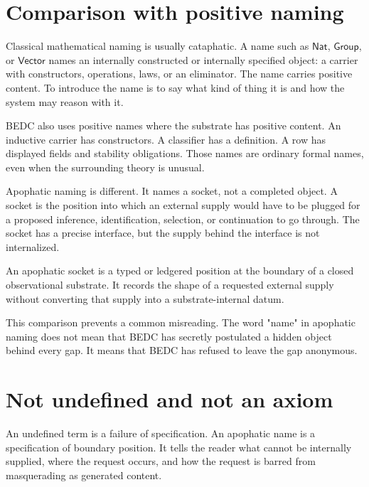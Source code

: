 \section{Comparison with positive naming}
\label{sec:apophatic-naming-positive-comparison}

Classical mathematical naming is usually cataphatic. A name such as $\mathsf{Nat}$, $\mathsf{Group}$, or $\mathsf{Vector}$ names an internally constructed or internally specified object: a carrier with constructors, operations, laws, or an eliminator. The name carries positive content. To introduce the name is to say what kind of thing it is and how the system may reason with it.

BEDC also uses positive names where the substrate has positive content. An inductive carrier has constructors. A classifier has a definition. A \NameCert{} row has displayed fields and stability obligations. Those names are ordinary formal names, even when the surrounding theory is unusual.

Apophatic naming is different. It names a socket, not a completed object. A socket is the position into which an external supply would have to be plugged for a proposed inference, identification, selection, or continuation to go through. The socket has a precise interface, but the supply behind the interface is not internalized.

\begin{definition}
\label{def:apophatic-socket-rather-than-object}
An apophatic socket is a typed or ledgered position at the boundary of a closed observational substrate. It records the shape of a requested external supply without converting that supply into a substrate-internal datum.
\end{definition}

This comparison prevents a common misreading. The word "name" in apophatic naming does not mean that BEDC has secretly postulated a hidden object behind every gap. It means that BEDC has refused to leave the gap anonymous.

\section{Not undefined and not an axiom}
\label{sec:apophatic-naming-not-axiom}

An undefined term is a failure of specification. An apophatic name is a specification of boundary position. It tells the reader what cannot be internally supplied, where the request occurs, and how the request is barred from masquerading as generated content.

